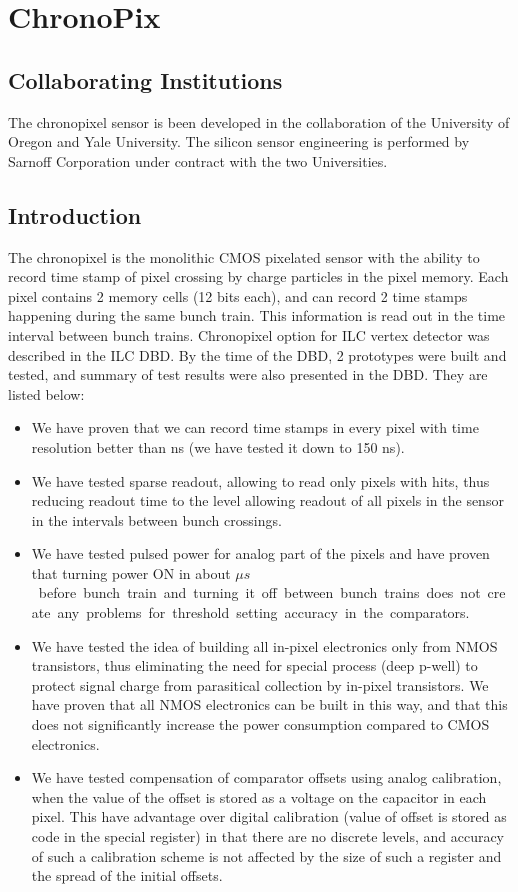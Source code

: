 \section{ChronoPix}
\subsection{Collaborating Institutions}
    The chronopixel sensor is been developed in the collaboration of the University of Oregon and Yale University. The silicon sensor engineering is performed by Sarnoff Corporation under contract with the two Universities.

\subsection{Introduction}
The chronopixel is the monolithic CMOS pixelated sensor with the ability to record time stamp of pixel crossing by charge particles in the pixel memory. Each pixel contains 2 memory cells (12 bits each), and can record 2 time stamps happening during the same bunch train. This information is read out in the time interval between bunch trains. Chronopixel option for ILC vertex detector was described in the ILC DBD. By the time of the DBD, 2 prototypes were built and tested, and summary of test results were also presented in the DBD. They are listed below: 
\begin{itemize}
    \item We have proven that we can record time stamps in every pixel with time resolution better than \unit[300]{ns} (we have tested it down to 150 ns).
    \item We have tested sparse readout, allowing to read only pixels with hits, thus reducing readout time to the level allowing readout of all pixels in the sensor in the intervals between bunch crossings.
    \item We have tested pulsed power for analog part of the pixels and have proven that turning power ON in about \unit[100]{$\mu s$} before bunch train and turning it off between bunch trains does not create any problems for threshold setting accuracy in the comparators.
    \item We have tested the idea of building all in-pixel electronics only from NMOS transistors, thus eliminating the need for special process (deep p-well) to protect signal charge from parasitical collection by in-pixel transistors. We have proven that all NMOS electronics can be built in this way, and that this does not significantly increase the power consumption compared to CMOS electronics.
    \item We have tested compensation of comparator offsets using analog calibration, when the value of the offset is stored as a voltage on the capacitor in each pixel. This have advantage over digital calibration (value of offset is stored as code in the special register) in that there are no discrete levels, and accuracy of such a calibration scheme is not affected by the size of such a register and the spread of the initial offsets.
\end{itemize}
